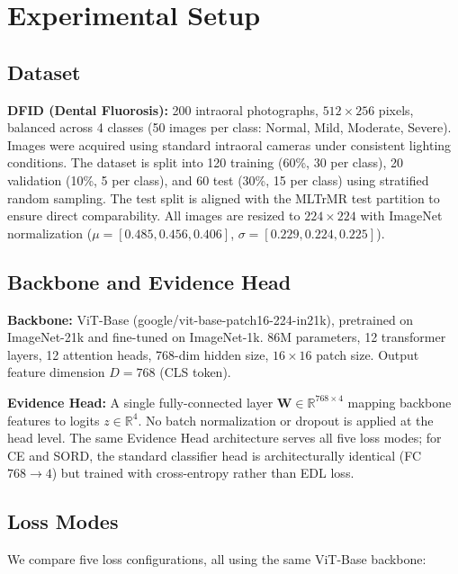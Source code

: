 \section{Experimental Setup}

\subsection{Dataset}

\textbf{DFID (Dental Fluorosis):} 200 intraoral photographs, $512 \times 256$ pixels, balanced across 4 classes (50 images per class: Normal, Mild, Moderate, Severe). Images were acquired using standard intraoral cameras under consistent lighting conditions. The dataset is split into 120 training (60\%, 30 per class), 20 validation (10\%, 5 per class), and 60 test (30\%, 15 per class) using stratified random sampling. The test split is aligned with the MLTrMR \cite{xu2025mltrmr} test partition to ensure direct comparability. All images are resized to $224 \times 224$ with ImageNet normalization ($\mu=[0.485, 0.456, 0.406]$, $\sigma=[0.229, 0.224, 0.225]$).

\subsection{Backbone and Evidence Head}

\textbf{Backbone:} ViT-Base (google/vit-base-patch16-224-in21k), pretrained on ImageNet-21k and fine-tuned on ImageNet-1k. 86M parameters, 12 transformer layers, 12 attention heads, 768-dim hidden size, $16 \times 16$ patch size. Output feature dimension $D = 768$ (CLS token).

\textbf{Evidence Head:} A single fully-connected layer $\mathbf{W} \in \mathbb{R}^{768 \times 4}$ mapping backbone features to logits $z \in \mathbb{R}^4$. No batch normalization or dropout is applied at the head level. The same Evidence Head architecture serves all five loss modes; for CE and SORD, the standard classifier head is architecturally identical (FC $768 \to 4$) but trained with cross-entropy rather than EDL loss.

\subsection{Loss Modes}

We compare five loss configurations, all using the same ViT-Base backbone:


